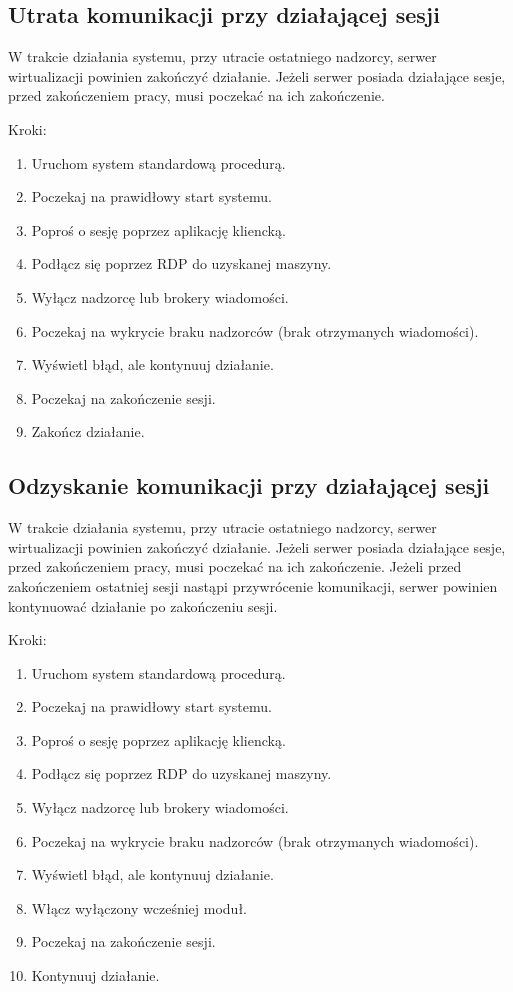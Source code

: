 \documentclass[../analiza-rozwiazania.tex]{subfiles}
\begin{document}
\subsection{Utrata komunikacji przy działającej sesji}
W trakcie działania systemu, przy utracie ostatniego nadzorcy, serwer wirtualizacji powinien zakończyć działanie. Jeżeli serwer posiada działające sesje, przed zakończeniem pracy, musi poczekać na ich zakończenie.

Kroki:
\begin{enumerate}
  \item Uruchom system standardową procedurą.
  \item Poczekaj na prawidłowy start systemu.
  \item Poproś o sesję poprzez aplikację kliencką.
  \item Podłącz się poprzez RDP do uzyskanej maszyny.
  \item Wyłącz nadzorcę lub brokery wiadomości.
  \item Poczekaj na wykrycie braku nadzorców (brak otrzymanych wiadomości).
  \item Wyświetl błąd, ale kontynuuj działanie.
  \item Poczekaj na zakończenie sesji.
  \item Zakończ działanie.
\end{enumerate}

\subsection{Odzyskanie komunikacji przy działającej sesji}
W trakcie działania systemu, przy utracie ostatniego nadzorcy, serwer wirtualizacji powinien zakończyć działanie. Jeżeli serwer posiada działające sesje, przed zakończeniem pracy, musi poczekać na ich zakończenie. Jeżeli przed zakończeniem ostatniej sesji nastąpi przywrócenie komunikacji, serwer powinien kontynuować działanie po zakończeniu sesji.

Kroki:
\begin{enumerate}
  \item Uruchom system standardową procedurą.
  \item Poczekaj na prawidłowy start systemu.
  \item Poproś o sesję poprzez aplikację kliencką.
  \item Podłącz się poprzez RDP do uzyskanej maszyny.
  \item Wyłącz nadzorcę lub brokery wiadomości.
  \item Poczekaj na wykrycie braku nadzorców (brak otrzymanych wiadomości).
  \item Wyświetl błąd, ale kontynuuj działanie.
  \item Włącz wyłączony wcześniej moduł.
  \item Poczekaj na zakończenie sesji.
  \item Kontynuuj działanie.
\end{enumerate}
\end{document}
